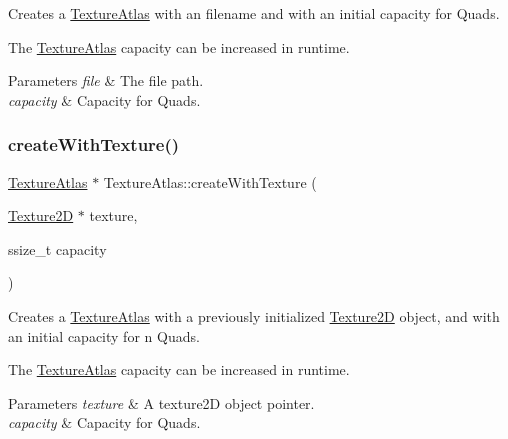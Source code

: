Creates a \hyperlink{classTextureAtlas}{Texture\+Atlas} with an filename and with an initial capacity for Quads.

The \hyperlink{classTextureAtlas}{Texture\+Atlas} capacity can be increased in runtime. 
\begin{DoxyParams}{Parameters}
{\em file} & The file path. \\
\hline
{\em capacity} & Capacity for Quads. \\
\hline
\end{DoxyParams}
\mbox{\label{classTextureAtlas_a2d41f36bf9d0aee784b604a0f2c34c1f}} 
\subsubsection{\texorpdfstring{create\+With\+Texture()}{createWithTexture()}\hspace{0.1cm}{\footnotesize\ttfamily [1/2]}}
{\footnotesize\ttfamily \hyperlink{classTextureAtlas}{Texture\+Atlas} $\ast$ Texture\+Atlas\+::create\+With\+Texture (\begin{DoxyParamCaption}\item[{\hyperlink{classTexture2D}{Texture2D} $\ast$}]{texture,  }\item[{ssize\+\_\+t}]{capacity }\end{DoxyParamCaption})\hspace{0.3cm}{\ttfamily [static]}}

Creates a \hyperlink{classTextureAtlas}{Texture\+Atlas} with a previously initialized \hyperlink{classTexture2D}{Texture2D} object, and with an initial capacity for n Quads.

The \hyperlink{classTextureAtlas}{Texture\+Atlas} capacity can be increased in runtime. 
\begin{DoxyParams}{Parameters}
{\em texture} & A texture2D object pointer. \\
\hline
{\em capacity} & Capacity for Quads. \\
\hline
\end{DoxyParams}
\mbox{\label{classTextureAtlas_aa71e400bb67b6d77871ae76a32750bdf}} 
